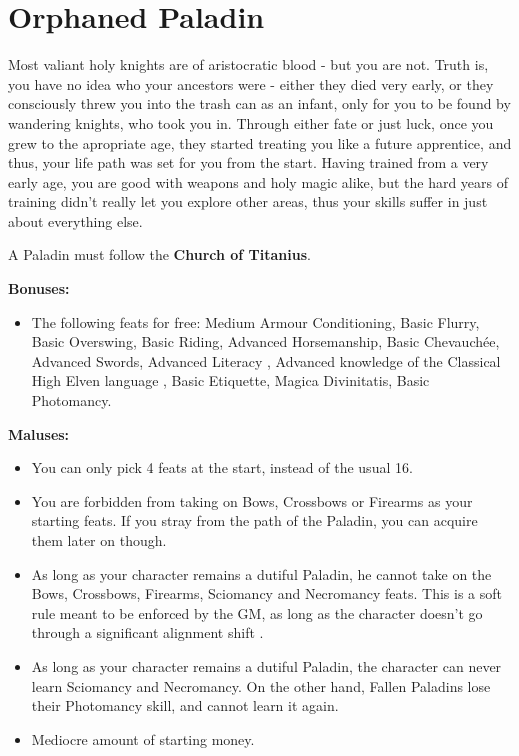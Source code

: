 \section{Orphaned Paladin}
Most valiant holy knights are of aristocratic blood - but you are not. Truth is, you have no idea who your ancestors were - either they died very early, or they consciously threw you into the trash can as an infant, only for you to be found by wandering knights, who took you in. Through either fate or just luck, once you grew to the apropriate age, they started treating you like a future apprentice, and thus, your life path was set for you from the start. Having trained from a very early age, you are good with weapons and holy magic alike, but the hard years of training didn't really let you explore other areas, thus your skills suffer in just about everything else.

A Paladin must follow the \textbf{Church of Titanius}.

\textbf{Bonuses:}
\begin{itemize}
	\item The following feats for free: Medium Armour Conditioning, Basic Flurry, Basic Overswing, Basic Riding, Advanced Horsemanship, Basic Chevauchée, Advanced Swords, Advanced Literacy , Advanced knowledge of the Classical High Elven language , Basic Etiquette, Magica Divinitatis, Basic Photomancy.
\end{itemize}


\textbf{Maluses:}
\begin{itemize}
	\item You can only pick 4 feats at the start, instead of the usual 16.
	\item You are forbidden from taking on Bows, Crossbows or Firearms as your starting feats. If you stray from the path of the Paladin, you can acquire them later on though.
	\item As long as your character remains a dutiful Paladin, he cannot take on the Bows, Crossbows, Firearms, Sciomancy and Necromancy feats. This is a soft rule meant to be enforced by the GM, as long as the character doesn't go through a significant alignment shift .
	\item As long as your character remains a dutiful Paladin, the character can never learn Sciomancy and Necromancy. On the other hand, Fallen Paladins lose their Photomancy skill, and cannot learn it again.
	\item Mediocre amount of starting money.
\end{itemize}
